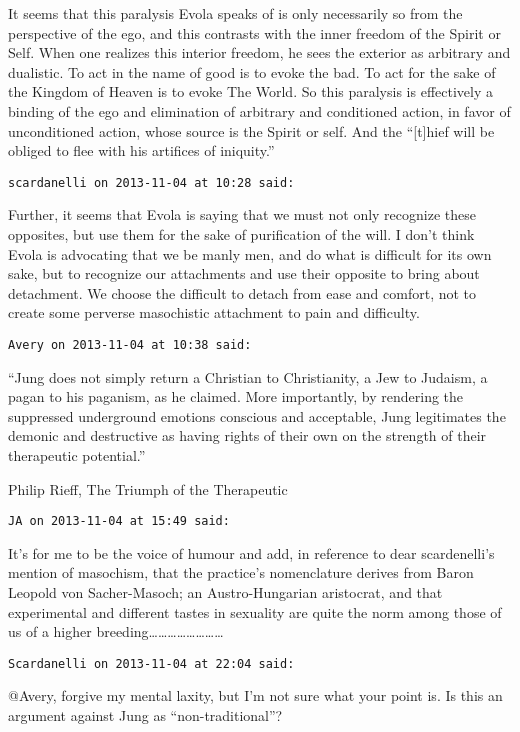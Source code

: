 \begin{footnotesize}
\begin{sffamily}
It seems that this paralysis Evola speaks of is only necessarily so from the perspective of the ego, and this contrasts with the inner freedom of the Spirit or Self. When one realizes this interior freedom, he sees the exterior as arbitrary and dualistic. To act in the name of good is to evoke the bad. To act for the sake of the Kingdom of Heaven is to evoke The World. So this paralysis is effectively a binding of the ego and elimination of arbitrary and conditioned action, in favor of unconditioned action, whose source is the Spirit or self. And the “[t]hief will be obliged to flee with his artifices of iniquity.”


\hfill

\texttt{scardanelli on 2013-11-04 at 10:28 said: }

Further, it seems that Evola is saying that we must not only recognize these opposites, but use them for the sake of purification of the will. I don't think Evola is advocating that we be manly men, and do what is difficult for its own sake, but to recognize our attachments and use their opposite to bring about detachment. We choose the difficult to detach from ease and comfort, not to create some perverse masochistic attachment to pain and difficulty.


\hfill

\texttt{Avery on 2013-11-04 at 10:38 said: }

“Jung does not simply return a Christian to Christianity, a Jew to Judaism, a pagan to his paganism, as he claimed. More importantly, by rendering the suppressed underground emotions conscious and acceptable, Jung legitimates the demonic and destructive as having rights of their own on the strength of their therapeutic potential.”

Philip Rieff, The Triumph of the Therapeutic


\hfill

\texttt{JA on 2013-11-04 at 15:49 said: }

It's for me to be the voice of humour and add, in reference to dear scardenelli's mention of masochism, that the practice's nomenclature derives from Baron Leopold von Sacher-Masoch; an Austro-Hungarian aristocrat, and that experimental and different tastes in sexuality are quite the norm among those of us of a higher breeding……………………


\hfill

\texttt{Scardanelli on 2013-11-04 at 22:04 said: }

@Avery, forgive my mental laxity, but I'm not sure what your point is. Is this an argument against Jung as “non-traditional”?


\end{sffamily}
\end{footnotesize}
